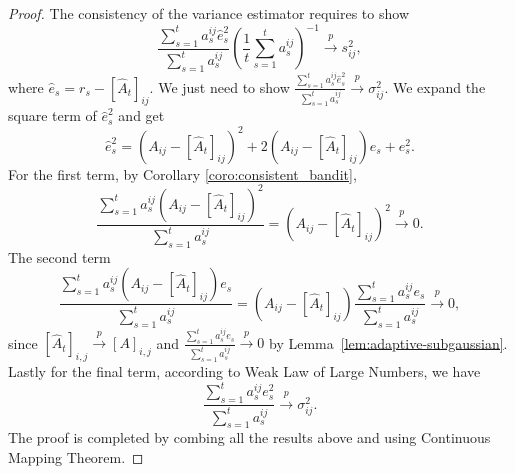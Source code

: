 \documentclass[12pt]{article}
\begin{document}
\begin{proof}
The consistency of the variance estimator requires to show
\begin{equation*}
    \frac{\sum_{s=1}^t a_s^{ij} \widehat{e}_s^2}{\sum_{s=1}^t a_s^{ij}} \left(\frac{1}{t}\sum_{s=1}^{t} a_s^{ij} \right)^{-1} \stackrel{p}{\to} s_{ij}^2,
\end{equation*}
where $\widehat{e}_s = r_s - [\widehat{A}_t]_{ij}$. We just need to show $\frac{\sum_{s=1}^t a_s^{ij} \widehat{e}_s^2}{\sum_{s=1}^t a_s^{ij}} \stackrel{p}{\to} \sigma_{ij}^2$.
We expand the square term of $\widehat{e}_s^2$ and get
\begin{equation*}
    \widehat{e}_s^2 = \left(A_{ij} - [\widehat{A}_t]_{ij}\right)^2 + 2\left(A_{ij} - [\widehat{A}_t]_{ij}\right)e_s+e_s^2.
\end{equation*}
For the first term, by Corollary \ref{coro:consistent_bandit},
\begin{equation*}
    \frac{\sum_{s=1}^t a_s^{ij} \left(A_{ij} - [\widehat{A}_t]_{ij}\right)^2}{\sum_{s=1}^t a_s^{ij}} = \left(A_{ij} - [\widehat{A}_t]_{ij}\right)^2 \stackrel{p}{\to} 0.
\end{equation*}
The second term 
\begin{equation*}
    \frac{\sum_{s=1}^t a_s^{ij} \left(A_{ij} - [\widehat{A}_t]_{ij}\right) e_s}{\sum_{s=1}^t a_s^{ij}} = \left(A_{ij} - [\widehat{A}_t]_{ij}\right)\frac{\sum_{s=1}^t a_s^{ij}  e_s}{\sum_{s=1}^t a_s^{ij}} \stackrel{p}{\to} 0,
\end{equation*}
since $ [\widehat{A}_t]_{i,j} \stackrel{p}{\to} [A]_{i,j}$ and  $\frac{\sum_{s=1}^t a_s^{ij} e_s}{\sum_{s=1}^t a_s^{ij}} \stackrel{p}{\to}0$ by Lemma~\ref{lem:adaptive-subgaussian}. Lastly for the final term, according to Weak Law of Large Numbers, we have
\begin{equation*}
    \frac{\sum_{s=1}^t a_s^{ij} e_s^2}{\sum_{s=1}^t a_s^{ij}} \stackrel{p}{\to} \sigma_{ij}^2.
\end{equation*}
The proof is completed by combing all the results above and using Continuous Mapping Theorem.
\end{proof}
\end{document}
